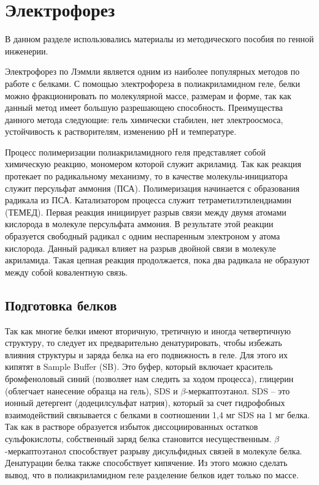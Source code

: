 \section{Электрофорез}

В данном разделе использовались материалы из методического пособия по генной инженерии.

Электрофорез по Лэммли является одним из наиболее популярных методов по работе с белками. С
помощью электрофореза в полиакриламидном геле, белки можно фракционировать по молекулярной
массе, размерам и форме, так как данный метод имеет большую разрешающею способность. Преимущества
данного метода следующие: гель химически стабилен, нет электроосмоса, устойчивость к
растворителям, изменению рН и температуре.

Процесс полимеризации полиакриламидного геля представляет собой химическую реакцию,
мономером которой служит акриламид. Так как реакция протекает по радикальному механизму, то
в качестве молекулы-инициатора служит персульфат аммония (ПСА). Полимеризация начинается с
образования радикала из ПСА. Катализатором процесса служит тетраметилэтилендиамин (ТЕМЕД). Первая
реакция инициирует разрыв связи между двумя атомами кислорода в молекуле персульфата аммония. В
результате этой реакции образуется свободный радикал с одним неспаренным электроном у атома
кислорода. Данный радикал влияет на разрыв двойной связи в молекуле акриламида. Такая цепная
реакция продолжается, пока два радикала не образуют между собой ковалентную связь.

\subsection{Подготовка белков}

Так как многие белки имеют вторичную, третичную и иногда четвертичную структуру, то следует их
предварительно денатурировать, чтобы избежать влияния структуры и заряда белка на его
подвижность в геле. Для этого их кипятят в Sample Buffer (SB). Это буфер, который включает краситель
бромфеноловый синий (позволяет нам следить за ходом процесса), глицерин (облегчает нанесение
образца на гель), SDS и $\beta$-меркаптоэтанол. SDS -- это ионный детергент (додецилсульфат натрия), который
за счет гидрофобных взаимодействий связывается с белками в соотношении 1,4 мг SDS на 1 мг белка. Так
как в растворе образуется избыток диссоциированных остатков сульфокислоты, собственный заряд
белка становится несущественным. $\beta$-меркаптоэтанол способствует разрыву дисульфидных связей в
молекуле белка. Денатурации белка также способствует кипячение. Из этого можно сделать вывод, что
в полиакриламидном геле разделение белков идет только по массе.

